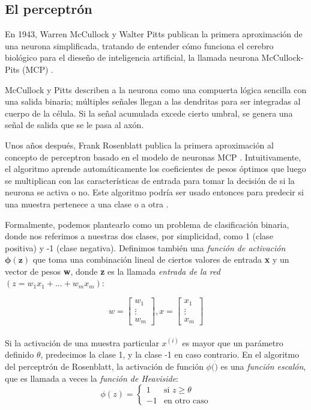 \subsection{El perceptrón}
En 1943, Warren McCullock y Walter Pitts publican la primera aproximación de una
neurona simplificada, tratando de entender cómo funciona el cerebro biológico para
el dieseño de inteligencia artificial, la llamada neurona McCullock-Pits (MCP) \cite{mcp}.

McCullock y Pitts describen a la neurona como una compuerta lógica sencilla con una
salida binaria; múltiples señales llegan a las dendritas para ser integradas al cuerpo
de la célula. Si la señal acumulada excede cierto umbral, se genera una señal de salida
que se le pasa al axón.

Unos años después, Frank Rosenblatt publica la primera aproximación al concepto de
perceptron basado en el modelo de neuronas MCP \cite{rosenblatt}. Intuitivamente, el algoritmo
aprende automáticamente los coeficientes de pesos óptimos que luego se multiplican
con las características de entrada para tomar la decisión de si la neurona se activa
o no. Este algoritmo podría ser usado entonces para predecir si una muestra pertenece
a una clase o a otra \cite{python}.

Formalmente, podemos plantearlo como un problema de clasificación binaria, donde nos
referimos a nuestras dos clases, por simplicidad, como 1 (clase positiva) y -1
(clase negativa). Definimos también una \textit{función de activación $\mathbf{\phi (z)}$}
que toma una combinación lineal de ciertos valores de entrada \textbf{x} y un
vector de pesos \textbf{w}, donde \textbf{z} es la llamada \textit{entrada de la red}
$(z = w_1x_1 + ... + w_mx_m)$:

\begin{equation*}
w=
    \begin{bmatrix}
        w_1 \\
        \vdots \\
        w_m
    \end{bmatrix}
    , x=
    \begin{bmatrix}
      x_1 \\
      \vdots \\
      x_m
    \end{bmatrix}
\end{equation*}
\\
Si la activación de una muestra particular $x^{(i)}$ es mayor que un parámetro definido
$\theta$, predecimos la clase 1, y la clase -1 en caso contrario. En el algoritmo
del perceptrón de Rosenblatt, la activación de función $\phi (\dot)$ es una \textit{función escalón},
que es llamada a veces la \textit{función de Heaviside}:
\begin{equation*}
  \phi(z)= \left\{ \begin{array} {rl}
    1 & \text{si } z \geq \theta \\
    -1 & \text{en otro caso} \end{array} \right.
\end{equation*}

